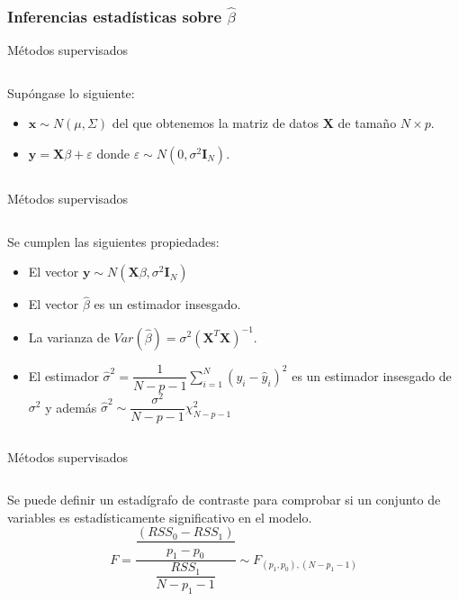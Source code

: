 \subsubsection{Inferencias estadísticas sobre $\hat{\beta}$}
\begin{frame}{Métodos supervisados}
\begin{columns}
\begin{column}{0.9\textwidth}

Supóngase lo siguiente: 
\begin{itemize}
\item $\mathbf{x}\sim N(\mu,\Sigma)$ del que obtenemos la matriz de datos $\mathbf{X}$ de tamaño $N\times p$. 
\item $\mathbf{y}=\mathbf{X}\beta+\varepsilon$ donde $\varepsilon\sim N(0,\sigma^2\mathbf{I}_N)$.
\end{itemize}
\end{column}
\end{columns}
\end{frame}



\begin{frame}{Métodos supervisados}
\begin{columns}
\begin{column}{0.9\textwidth}
Se cumplen las siguientes propiedades: 
\begin{itemize}
\item El vector $\mathbf{y}\sim N(\mathbf{X}\beta,\sigma^2\mathbf{I}_N)$
\item El vector $\hat{\beta}$ es un estimador insesgado.
\item La varianza de $Var(\hat{\beta})=\sigma^2(\mathbf{X}^T\mathbf{X})^{-1}$.
\item El estimador $\displaystyle\hat{\sigma}^2=\dfrac{1}{N-p-1}\sum_{i=1}^N(y_i-\hat{y}_i)^2$ es un estimador insesgado de $\sigma^2$ y además $\displaystyle\hat{\sigma}^2\sim \dfrac{\sigma^2}{N-p-1}\chi_{N-p-1}^2$
\end{itemize}

\end{column}
\end{columns}
\end{frame}

\begin{frame}{Métodos supervisados}
\begin{columns}
\begin{column}{0.9\textwidth}
Se puede definir un estadígrafo de contraste para comprobar si un conjunto de variables es estadísticamente significativo en el modelo. 
\begin{equation}\label{eq: Estimador F}
F=\dfrac{\dfrac{(RSS_0-RSS_1)}{p_1-p_0}}{\dfrac{RSS_1}{N-p_1-1}}\sim F_{(p_1,p_0),(N-p_1-1)}
\end{equation}
\end{column}
\end{columns}
\end{frame}

